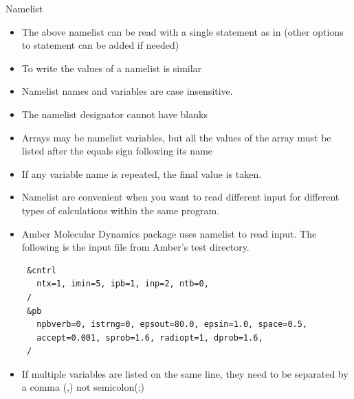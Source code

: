 \documentclass[10pt,t]{beamer}
\begin{document}
\begin{frame}{Namelist}
\begin{itemize}
\begin{itemize}
      \end{itemize}
    \item The above namelist can be read with a single statement as in (other options to  statement can be added if needed)\\
    \item To write the values of a namelist is similar\\
    \item Namelist names and variables are case insensitive.
    \item The namelist designator cannot have blanks
    \item Arrays may be namelist variables, but all the values of the array must be listed after the equals sign following its name
    \item If any variable name is repeated, the final value is taken.
    \item Namelist are convenient when you want to read different input for different types of calculations within the same program.
    \item Amber Molecular Dynamics package uses namelist to read input. The following is the input file from Amber's test directory.
      \begin{lstlisting}
 &cntrl 
   ntx=1, imin=5, ipb=1, inp=2, ntb=0,  
 /      
 &pb
   npbverb=0, istrng=0, epsout=80.0, epsin=1.0, space=0.5,  
   accept=0.001, sprob=1.6, radiopt=1, dprob=1.6,   
 /      
      \end{lstlisting}
    \item If multiple variables are listed on the same line, they need to be separated by a comma (,) not semicolon(;)
  \end{itemize}
\end{frame}
\end{document}
